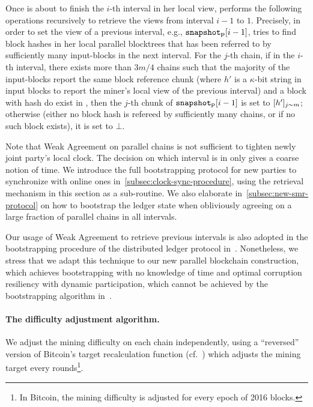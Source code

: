 Once \newParty is about to finish the $i$-th interval in her local view, \newParty performs the following operations recursively to retrieve the views from interval $i - 1$ to $1$.
%
Precisely, in order to set the view of a previous interval, e.g., $\mathtt{snapshot}_\mathsf{P}[i - 1]$, \newParty tries to find block hashes in her local parallel blocktrees that has been referred to by sufficiently many input-blocks in the next interval.
%
For the $j$-th chain, if in the $i$-th interval, there exists more than $3m / 4$ chains such that the majority of the input-blocks report the same block reference chunk  (where $h'$ is a $\kappa$-bit string in input blocks to report the miner's local view of the previous interval) and a block with hash  do exist in \parallelTreesLocal, then the $j$-th chunk of $\mathtt{snapshot}_\mathsf{P}[i - 1]$ is set to $[h']_{j\sim m}$; otherwise (either no block hash is refereed by sufficiently many chains, or if no such block exists), it is set to $\bot$.

Note that Weak Agreement on parallel chains is not sufficient to tighten newly joint party's local clock.
%
The decision on which interval \newParty is in only gives a coarse notion of time.
%
We introduce the full bootstrapping protocol for new parties to synchronize with online ones in~\cref{subsec:clock-sync-procedure}, using the retrieval mechanism in this section as a sub-routine.
%
We also elaborate in~\cref{subsec:new-smr-protocol} on how to bootstrap the ledger state when obliviously agreeing on a large fraction of parallel chains in all intervals.

\begin{remark} \label{remark:weak-agreement}
      Our usage of Weak Agreement to retrieve previous intervals is also adopted in the bootstrapping procedure of the distributed ledger protocol in~\cite{EC:GarKiaShe24}.
      Nonetheless, we stress that we adapt this technique to our new parallel blockchain construction, which achieves bootstrapping with no knowledge of time and optimal corruption resiliency with dynamic participation, which cannot be achieved by the bootstrapping algorithm in~\cite{EC:GarKiaShe24}.
\end{remark}

\paragraph{The difficulty adjustment algorithm.}
%
We adjust the mining difficulty on each chain independently, using a ``reversed'' version of Bitcoin's target recalculation function (cf.~\cite{TCC:GarKiaShe22}) which adjusts the mining target every \epochLen rounds\footnote{In Bitcoin, the mining difficulty is adjusted for every epoch of 2016 blocks.}.

